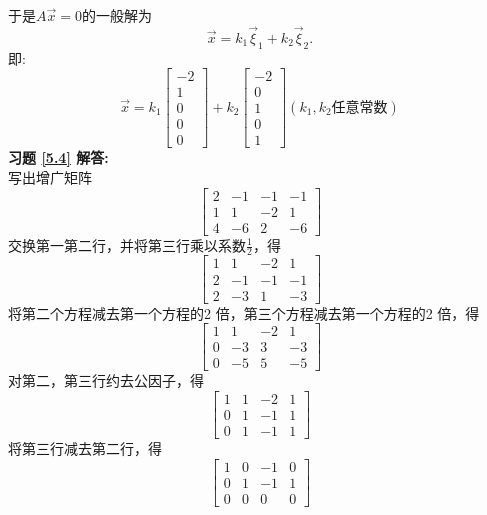 于是$A\vec{x}=0$的一般解为
\begin{equation*}
\vec{x}=k_1\vec{\xi}_1+k_2\vec{\xi}_2.
\end{equation*}
即:
\begin{equation*}
\vec{x}=k_1\begin{bmatrix}-2\\1\\0\\0\\0\end{bmatrix}+
k_2\begin{bmatrix}-2\\0\\1\\0\\1\end{bmatrix} (k_1,k_2\text{任意常数})
\end{equation*}
\textbf{习题 \ref{5.4} 解答:}\\
写出增广矩阵
\begin{equation*}
\begin{bmatrix}
2&-1&-1&-1\\1&1&-2&1\\4&-6&2&-6
\end{bmatrix}
\end{equation*}
交换第一第二行，并将第三行乘以系数$\frac{1}{2}$，得
\begin{equation*}
\begin{bmatrix}
1&1&-2&1\\
2&-1&-1&-1\\
2&-3&1&-3
\end{bmatrix}
\end{equation*}
将第二个方程减去第一个方程的2 倍，第三个方程减去第一个方程的2 倍，得
\begin{equation*}
\begin{bmatrix}
1&1&-2&1\\
0&-3&3&-3\\
0&-5&5&-5
\end{bmatrix}
\end{equation*}
对第二，第三行约去公因子，得
\begin{equation*}
\begin{bmatrix}
1&1&-2&1\\
0&1&-1&1\\
0&1&-1&1
\end{bmatrix}
\end{equation*}
将第三行减去第二行，得
\begin{equation*}
\begin{bmatrix}
1&0&-1&0\\
0&1&-1&1\\
0&0&0&0
\end{bmatrix}
\end{equation*}
